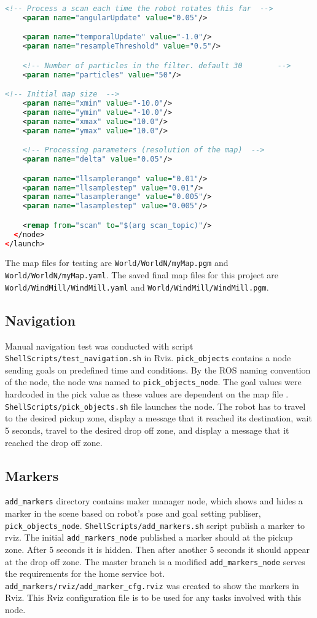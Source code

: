 \documentclass[10pt,journal,compsoc]{IEEEtran}
\begin{document}
\begin{lstlisting}[language=xml, caption={Python script to download dataset },label={list:customgmappinglaunch}]
    <!-- Process a scan each time the robot rotates this far  -->
    <param name="angularUpdate" value="0.05"/>

    <param name="temporalUpdate" value="-1.0"/>
    <param name="resampleThreshold" value="0.5"/>

    <!-- Number of particles in the filter. default 30        -->
    <param name="particles" value="50"/>

<!-- Initial map size  -->
    <param name="xmin" value="-10.0"/>
    <param name="ymin" value="-10.0"/>
    <param name="xmax" value="10.0"/>
    <param name="ymax" value="10.0"/>

    <!-- Processing parameters (resolution of the map)  -->
    <param name="delta" value="0.05"/>

    <param name="llsamplerange" value="0.01"/>
    <param name="llsamplestep" value="0.01"/>
    <param name="lasamplerange" value="0.005"/>
    <param name="lasamplestep" value="0.005"/>

    <remap from="scan" to="$(arg scan_topic)"/>
  </node>
</launch>
\end{lstlisting}

The map files for testing are \verb!World/WorldN/myMap.pgm! and \verb!World/WorldN/myMap.yaml!.
The saved final map files for this project are \verb!World/WindMill/WindMill.yaml! and \verb!World/WindMill/WindMill.pgm!.

\subsection{Navigation}
Manual navigation test was conducted with script \verb!ShellScripts/test_navigation.sh! in Rviz.
\verb!pick_objects! contains a node sending goals on predefined time and conditions. By the ROS naming convention of the node, the node was named to \verb!pick_objects_node!.
The goal values were hardcoded in the pick value as these values are dependent on the map file . \verb!ShellScripts/pick_objects.sh! file launches the node.
The robot has to travel to the desired pickup zone, display a message that it reached its destination, wait 5 seconds, travel to the desired drop off zone, and display a message that it reached the drop off zone.

\subsection{Markers}
\verb!add_markers! directory contains maker manager node, which shows and hides a marker in the scene based on robot's pose and goal setting publiser, \verb!pick_objects_node!.
\verb!ShellScripts/add_markers.sh! script publish a marker to rviz. The initial  \verb!add_markers_node! published a marker should at the pickup zone. After 5 seconds it is hidden. Then after another 5 seconds it should appear at the drop off zone. The master branch is a modified \verb!add_markers_node! serves the requirements for the home service bot. 
\verb!add_markers/rviz/add_marker_cfg.rviz! was created to show the markers in Rviz. This Rviz configuration file is to be used for any tasks involved with this node.
\end{document}
